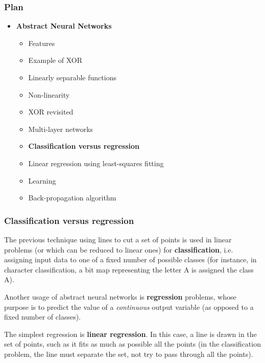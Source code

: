%
\begin{frame}
\frametitle{Plan}

\begin{itemize}

  \item \textbf{Abstract Neural Networks}

  \begin{itemize}

    \item Features

    \item Example of XOR

    \item Linearly separable functions

    \item Non-linearity

    \item XOR revisited

    \item Multi-layer networks

    \item \textbf{Classification versus regression}

    \item Linear regression using least-squares fitting

    \item Learning

    \item Back-propagation algorithm

  \end{itemize}

\end{itemize}

\end{frame}

%
\begin{frame}
\frametitle{Classification versus regression}

The previous technique using lines to cut a set of points is used in
linear problems (or which can be reduced to linear ones) for
\textbf{classification}, i.e. assigning input data to one of a fixed
number of possible classes (for instance, in character classification,
a bit map representing the letter A is assigned the class A).

\bigskip

Another usage of abstract neural networks is \textbf{regression}
problems, whose purpose is to predict the value of a \emph{continuous}
output variable (as opposed to a fixed number of classes). 

\bigskip

The simplest regression is \textbf{linear regression}. In this case, a
line is drawn in the set of points, such as it fits as much as
possible all the points (in the classification problem, the line must
separate the set, not try to pass through all the points).

\end{frame}

